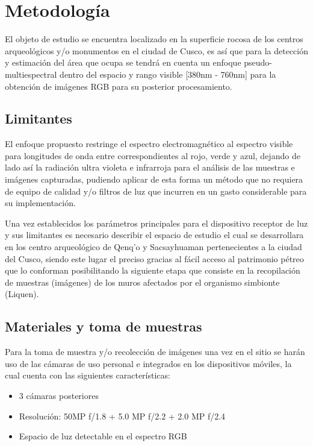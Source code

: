 \chapter{Metodología}

El objeto de estudio se encuentra localizado en la superficie rocosa de los centros arqueológicos y/o monumentos en el ciudad de Cusco, es así que para la detección y estimación del área que ocupa se tendrá en cuenta un enfoque pseudo-multiespectral dentro del espacio y rango visible [380nm - 760nm] para la obtención de imágenes RGB para su posterior procesamiento.

\section{Limitantes}
El enfoque propuesto restringe el espectro electromagnético al espectro visible para longitudes de onda entre correspondientes al rojo, verde y azul, dejando de lado así la radiación ultra violeta e infrarroja para el análisis de las muestras e imágenes capturadas, pudiendo aplicar de esta forma un método que no requiera de equipo de calidad y/o filtros de luz que incurren en un gasto considerable para su implementación.

Una vez establecidos los parámetros principales para el dispositivo receptor de luz y sus limitantes es necesario describir el espacio de estudio el cual se desarrollara en los centro arqueológico de Qenq'o y Sacsayhuaman pertenecientes a la ciudad del Cusco, siendo este lugar el preciso gracias al fácil acceso al patrimonio pétreo que lo conforman posibilitando la siguiente etapa que consiste en la recopilación de muestras (imágenes) de los muros afectados por el organismo simbionte (Liquen).

\section{Materiales y toma de muestras}
Para la toma de muestra y/o recolección de imágenes una vez en el sitio se harán uso de las cámaras de uso personal e integrados en los dispositivos móviles, la cual cuenta con las siguientes características:

\begin{itemize}
	\item 3 cámaras posteriores
	\item Resolución: 50MP f/1.8 + 5.0 MP f/2.2 + 2.0 MP f/2.4
	\item Espacio de luz detectable en el espectro RGB
\end{itemize} 

